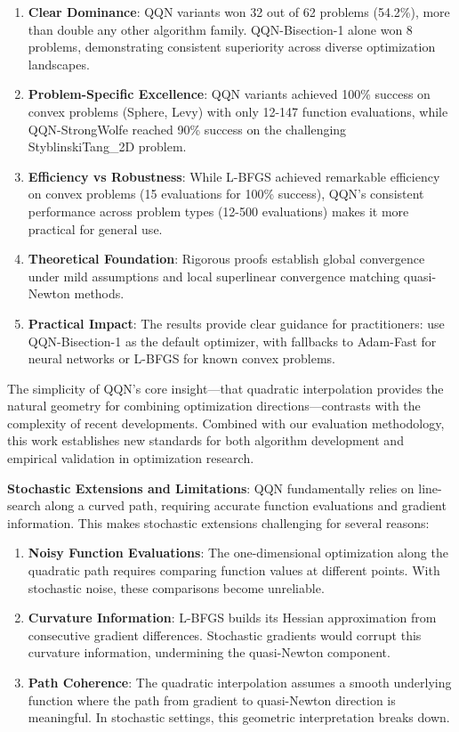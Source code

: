 \begin{enumerate}
\def\labelenumi{\arabic{enumi}.}
\item
  \textbf{Clear Dominance}: QQN variants won 32 out of 62 problems (54.2\%), more than double any other algorithm family. QQN-Bisection-1 alone won 8 problems, demonstrating consistent superiority across diverse optimization landscapes.
\item
  \textbf{Problem-Specific Excellence}: QQN variants achieved 100\% success on convex problems (Sphere, Levy) with only 12-147 function evaluations, while QQN-StrongWolfe reached 90\% success on the challenging StyblinskiTang\_2D problem.
\item
  \textbf{Efficiency vs Robustness}: While L-BFGS achieved remarkable efficiency on convex problems (15 evaluations for 100\% success), QQN's consistent performance across problem types (12-500 evaluations) makes it more practical for general use.
\item
  \textbf{Theoretical Foundation}: Rigorous proofs establish global convergence under mild assumptions and local superlinear convergence matching quasi-Newton methods.
\item
  \textbf{Practical Impact}: The results provide clear guidance for practitioners: use QQN-Bisection-1 as the default optimizer, with fallbacks to Adam-Fast for neural networks or L-BFGS for known convex problems.
\end{enumerate}

The simplicity of QQN's core insight---that quadratic interpolation provides the natural geometry for combining optimization directions---contrasts with the complexity of recent developments.
Combined with our evaluation methodology, this work establishes new standards for both algorithm development and empirical validation in optimization research.

\textbf{Stochastic Extensions and Limitations}: QQN fundamentally relies on line-search along a curved path, requiring accurate function evaluations and gradient information. This makes stochastic extensions challenging for several reasons:

\begin{enumerate}
\def\labelenumi{\arabic{enumi}.}
\item
  \textbf{Noisy Function Evaluations}: The one-dimensional optimization along the quadratic path requires comparing function values at different points.
  With stochastic noise, these comparisons become unreliable.
\item
  \textbf{Curvature Information}: L-BFGS builds its Hessian approximation from consecutive gradient differences.
  Stochastic gradients would corrupt this curvature information, undermining the quasi-Newton component.
\item
  \textbf{Path Coherence}: The quadratic interpolation assumes a smooth underlying function where the path from gradient to quasi-Newton direction is meaningful.
  In stochastic settings, this geometric interpretation breaks down.
\end{enumerate}

